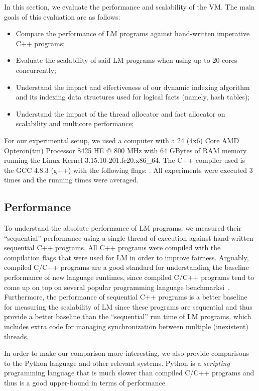 In this section, we evaluate the performance and scalability of the VM. The main
goals of this evaluation are as follows:

\begin{itemize}
   \item Compare the performance of LM programs against hand-written
      imperative C++ programs;
   \item Evaluate the scalability of said LM programs when using up to 20 cores
      concurrently;
   \item Understand the impact and effectiveness of our dynamic indexing
      algorithm and its indexing data structures used for logical facts (namely,
      hash tables);
   \item Understand the impact of the thread allocator and fact allocator on scalability and
      multicore performance;
\end{itemize}

For our experimental setup, we used a computer with a 24 (4x6) Core AMD
Opteron(tm) Processor 8425 HE $@$ 800 MHz with 64 GBytes of RAM memory running
the Linux Kernel 3.15.10-201.fc20.x86\_64. The C++ compiler used is the GCC
4.8.3 (g++) with the following  flags: .  All experiments were executed 3 times and the running times
were averaged.

\subsection{Performance}

To understand the absolute performance of LM programs, we measured their
``sequential'' performance using a single thread of execution against
hand-written sequential C++ programs. All C++ programs were compiled with the
compilation flags that were used for LM in order to improve fairness. Arguably,
compiled C/C++ programs are a good standard for understanding the baseline
performance of new language runtimes, since compiled C/C++ programs tend to come
up on top on several popular programming language
benchmarksi~\cite{language_benchmarks}.  Furthermore, the performance of
sequential C++ programs is a better baseline for measuring the scalability of LM
since these programs are sequential and thus provide a better baseline than the
``sequential'' run time of LM programs, which includes extra code for managing
synchronization between multiple (inexistent) threads.

In order to make our comparison more interesting, we also provide comparisons to
the Python language and other relevant systems. Python is a \emph{scripting}
programming language that is much slower than compiled C/C++ programs and thus
is a good upper-bound in terms of performance.

